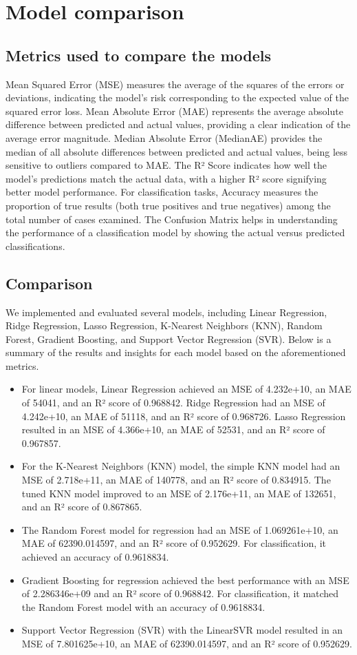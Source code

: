 \chapter{Model comparison}
\section{Metrics used to compare the models}
Mean Squared Error (MSE) measures the average of the squares of the errors or deviations, indicating the model's risk corresponding to the expected value of the squared error loss. Mean Absolute Error (MAE) represents the average absolute difference between predicted and actual values, providing a clear indication of the average error magnitude. Median Absolute Error (MedianAE) provides the median of all absolute differences between predicted and actual values, being less sensitive to outliers compared to MAE. The R² Score indicates how well the model's predictions match the actual data, with a higher R² score signifying better model performance. For classification tasks, Accuracy measures the proportion of true results (both true positives and true negatives) among the total number of cases examined. The Confusion Matrix helps in understanding the performance of a classification model by showing the actual versus predicted classifications.

\section{Comparison}
We implemented and evaluated several models, including Linear Regression, Ridge Regression, Lasso Regression, K-Nearest Neighbors (KNN), Random Forest, Gradient Boosting, and Support Vector Regression (SVR). Below is a summary of the results and insights for each model based on the aforementioned metrics.
{\small
\begin{itemize}
    \item For linear models, Linear Regression achieved an MSE of 4.232e+10, an MAE of 54041, and an R² score of 0.968842. Ridge Regression had an MSE of 4.242e+10, an MAE of 51118, and an R² score of 0.968726. Lasso Regression resulted in an MSE of 4.366e+10, an MAE of 52531, and an R² score of 0.967857.
    \item For the K-Nearest Neighbors (KNN) model, the simple KNN model had an MSE of 2.718e+11, an MAE of 140778, and an R² score of 0.834915. The tuned KNN model improved to an MSE of 2.176e+11, an MAE of 132651, and an R² score of 0.867865.
    \item The Random Forest model for regression had an MSE of 1.069261e+10, an MAE of 62390.014597, and an R² score of 0.952629. For classification, it achieved an accuracy of 0.9618834.
    \item Gradient Boosting for regression achieved the best performance with an MSE of 2.286346e+09 and an R² score of 0.968842. For classification, it matched the Random Forest model with an accuracy of 0.9618834.
    \item Support Vector Regression (SVR) with the LinearSVR model resulted in an MSE of 7.801625e+10, an MAE of 62390.014597, and an R² score of 0.952629.
\end{itemize}
}


